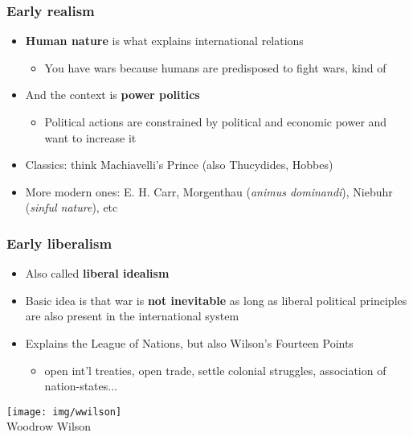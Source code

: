 \documentclass[aspectratio=43,handout]{beamer}
\begin{document}
\begin{frame}
\frametitle{Early realism}
\centering

\begin{itemize}
  \item \textbf{Human nature} is what explains international relations
  \begin{itemize}
    \item You have wars because humans are predisposed to fight wars, kind of
  \end{itemize}
  \item And the context is \textbf{power politics}
  \begin{itemize}
    \item Political actions are constrained by political and economic power and want to increase it
  \end{itemize}
  \item<2-> Classics: think Machiavelli's Prince (also Thucydides, Hobbes)
  \item<2-> More modern ones: E. H. Carr, Morgenthau (\textit{animus dominandi}), Niebuhr (\textit{sinful nature}), etc
\end{itemize}

\end{frame}

\begin{frame}
\frametitle{Early liberalism}
\centering

\begin{minipage}{.58\textwidth}\centering
\begin{itemize}
  \item Also called \textbf{liberal idealism}
  \item Basic idea is that war is \textbf{not inevitable} as long as liberal political principles are also present in the international system
  \item Explains the League of Nations, but also Wilson's Fourteen Points
  \begin{itemize}
    \item open int'l treaties, open trade, settle colonial struggles, association of nation-states...
  \end{itemize}
\end{itemize}
\end{minipage}\hfill
\begin{minipage}{.39\textwidth}\centering
\texttt{[image: img/wwilson]}\\{\small Woodrow Wilson}
\end{minipage}

\end{frame}
\end{document}
